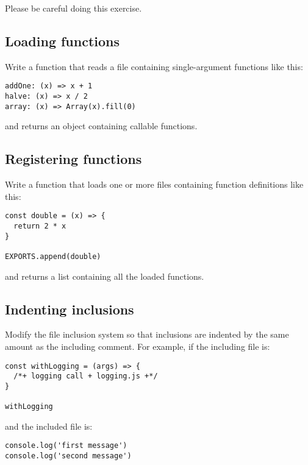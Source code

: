 \documentclass[krantzl]{krantz}
\begin{document}
\noindent Please be careful doing this exercise.

\subsection*{Loading functions}


Write a function that reads a file containing single-argument functions like this:

\begin{lstlisting}[frame=single,frameround=tttt]
addOne: (x) => x + 1
halve: (x) => x / 2
array: (x) => Array(x).fill(0)
\end{lstlisting}


\noindent and returns an object containing callable functions.

\subsection*{Registering functions}


Write a function that loads one or more files containing function definitions like this:

\begin{lstlisting}[frame=single,frameround=tttt]
const double = (x) => {
  return 2 * x
}

EXPORTS.append(double)
\end{lstlisting}


\noindent and returns a list containing all the loaded functions.

\subsection*{Indenting inclusions}


Modify the file inclusion system
so that inclusions are indented by the same amount as the including comment.
For example,
if the including file is:

\begin{lstlisting}[frame=single,frameround=tttt]
const withLogging = (args) => {
  /*+ logging call + logging.js +*/
}

withLogging
\end{lstlisting}


\noindent and the included file is:

\begin{lstlisting}[frame=single,frameround=tttt]
console.log('first message')
console.log('second message')
\end{lstlisting}
\end{document}
